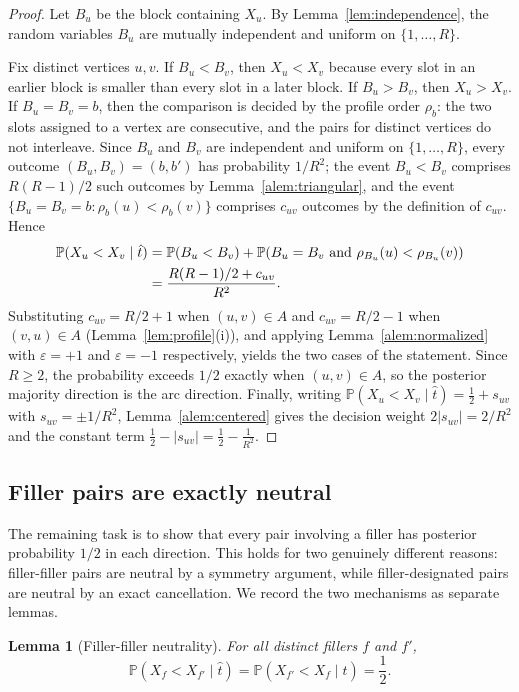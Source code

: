 \documentclass[11pt]{article}
\newtheorem{lemma}{Lemma}
\newcommand{\Prb}{\mathbb{P}}
\begin{document}
\begin{proof}
Let $B_u$ be the block containing $X_u$.  By Lemma~\ref{lem:independence}, the random variables $B_u$ are mutually independent and uniform on $\{1,\ldots,R\}$.

Fix distinct vertices $u,v$.  If $B_u<B_v$, then $X_u<X_v$ because every slot in an earlier block is smaller than every slot in a later block.  If $B_u>B_v$, then $X_u>X_v$.  If $B_u=B_v=b$, then the comparison is decided by the profile order $\rho_b$: the two slots assigned to a vertex are consecutive, and the pairs for distinct vertices do not interleave.  Since $B_u$ and $B_v$ are independent and uniform on $\{1,\ldots,R\}$, every outcome $(B_u,B_v)=(b,b')$ has probability $1/R^2$; the event $B_u<B_v$ comprises $R(R-1)/2$ such outcomes by Lemma~\ref{alem:triangular}, and the event $\{B_u=B_v=b:\rho_b(u)<\rho_b(v)\}$ comprises $c_{uv}$ outcomes by the definition of $c_{uv}$.  Hence
\begin{align}
  \Prb(X_u<X_v\mid \hat t)
  &=\Prb(B_u<B_v)+\Prb(B_u=B_v\text{ and }\rho_{B_u}(u)<\rho_{B_u}(v)) \notag\\
  &=\frac{R(R-1)/2+c_{uv}}{R^2}.
\end{align}
Substituting $c_{uv}=R/2+1$ when $(u,v)\in A$ and $c_{uv}=R/2-1$ when $(v,u)\in A$ (Lemma~\ref{lem:profile}(i)), and applying Lemma~\ref{alem:normalized} with $\varepsilon=+1$ and $\varepsilon=-1$ respectively, yields the two cases of the statement.  Since $R\ge 2$, the probability exceeds $1/2$ exactly when $(u,v)\in A$, so the posterior majority direction is the arc direction.  Finally, writing $\Prb(X_u<X_v\mid\hat t)=\tfrac12+s_{uv}$ with $s_{uv}=\pm 1/R^2$, Lemma~\ref{alem:centered} gives the decision weight $2|s_{uv}|=2/R^2$ and the constant term $\tfrac12-|s_{uv}|=\tfrac12-\tfrac1{R^2}$.
\end{proof}

\subsection{Filler pairs are exactly neutral}

The remaining task is to show that every pair involving a filler has posterior probability $1/2$ in each direction.  This holds for two genuinely different reasons: filler-filler pairs are neutral by a symmetry argument, while filler-designated pairs are neutral by an exact cancellation.  We record the two mechanisms as separate lemmas.

\begin{lemma}[Filler-filler neutrality]\label{lem:fillerfiller}
For all distinct fillers $f$ and $f'$,
\begin{equation}
  \Prb(X_f<X_{f'}\mid \hat t)=\Prb(X_{f'}<X_f\mid \hat t)=\frac12 .
\end{equation}
\end{lemma}
\end{document}
